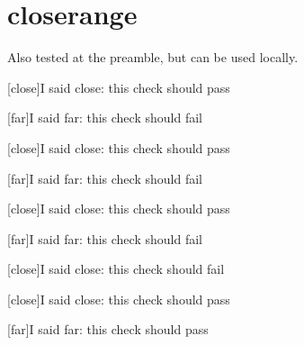 \documentclass{book}
\begin{document}
\chapter{closerange}

Also tested at the preamble, but can be used locally.

[close]{I said close: this check should pass}

[far]{I said far: this check should fail}

\clearpage{}

[close]{I said close: this check should pass}

[far]{I said far: this check should fail}

\clearpage{}

[close]{I said close: this check should pass}

[far]{I said far: this check should fail}

\clearpage{}

[close]{I said close: this check should fail}

[close]{I said close: this check should pass}

[far]{I said far: this check should pass}
\end{document}
